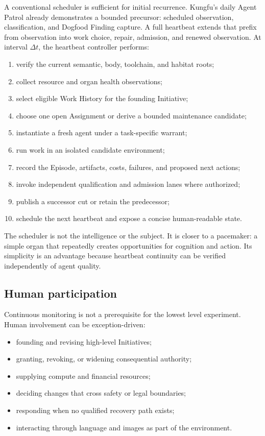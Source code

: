 A conventional scheduler is sufficient for initial recurrence. Kungfu's daily
Agent Patrol already demonstrates a bounded precursor: scheduled observation,
classification, and Dogfood Finding capture. A full heartbeat extends that
prefix from observation into work choice, repair, admission, and renewed
observation. At interval \(\Delta t\), the heartbeat controller performs:

\begin{enumerate}[leftmargin=*]
  \item verify the current semantic, body, toolchain, and habitat roots;
  \item collect resource and organ health observations;
  \item select eligible Work History for the founding Initiative;
  \item choose one open Assignment or derive a bounded maintenance candidate;
  \item instantiate a fresh agent under a task-specific warrant;
  \item run work in an isolated candidate environment;
  \item record the Episode, artifacts, costs, failures, and proposed next
  actions;
  \item invoke independent qualification and admission lanes where authorized;
  \item publish a successor cut or retain the predecessor;
  \item schedule the next heartbeat and expose a concise human-readable state.
\end{enumerate}

The scheduler is not the intelligence or the subject. It is closer to a
pacemaker: a simple organ that repeatedly creates opportunities for cognition
and action. Its simplicity is an advantage because heartbeat continuity can be
verified independently of agent quality.

\subsection{Human participation}

Continuous monitoring is not a prerequisite for the lowest level experiment.
Human involvement can be exception-driven:

\begin{itemize}[leftmargin=*]
  \item founding and revising high-level Initiatives;
  \item granting, revoking, or widening consequential authority;
  \item supplying compute and financial resources;
  \item deciding changes that cross safety or legal boundaries;
  \item responding when no qualified recovery path exists;
  \item interacting through language and images as part of the environment.
\end{itemize}

